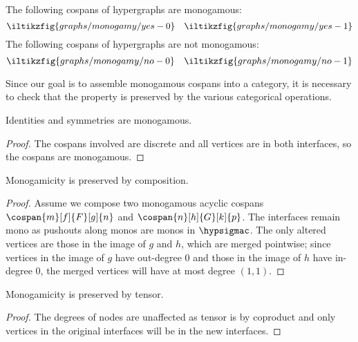 \begin{example}\label{ex:monogamous}
    The following cospans of hypergraphs are monogamous:
    \[
        \iltikzfig{graphs/monogamy/yes-0}
        \quad
        \iltikzfig{graphs/monogamy/yes-1}
    \]
    The following cospans of hypergraphs are not monogamous:
    \[
        \iltikzfig{graphs/monogamy/no-0}
        \quad
        \iltikzfig{graphs/monogamy/no-1}
    \]
\end{example}

Since our goal is to assemble monogamous cospans into a category, it is
necessary to check that the property is preserved by the various categorical
operations.

\begin{lemma}\label{lem:identities-symmetries-monogamous}
    Identities and symmetries are monogamous.
\end{lemma}
\begin{proof}
    The cospans involved are discrete and all vertices are in both
    interfaces, so the cospans are monogamous.
\end{proof}

\begin{lemma}\label{lem:monogamicity-preserved-composition}
    Monogamicity is preserved by composition.
\end{lemma}
\begin{proof}
    Assume we compose two monogamous acyclic cospans \(
    \cospan{m}[f]{F}[g]{n}
    \) and \(
    \cospan{n}[h]{G}[k]{p}
    \).
    The interfaces remain mono as pushouts along monos are monos in
    \(\hypsigmac\).
    The only altered vertices are those in the image of
    \(g\) and \(h\), which are merged pointwise; since vertices in the image of
    \(g\) have out-degree \(0\) and those in the image of \(h\) have in-degree
    \(0\), the merged vertices will have at most degree \((1, 1)\).
\end{proof}

\begin{lemma}\label{lem:monogamicity-preserved-tensor}
    Monogamicity is preserved by tensor.
\end{lemma}
\begin{proof}
    The degrees of nodes are unaffected as tensor is by coproduct and
    only vertices in the original interfaces will be in the new interfaces.
\end{proof}

